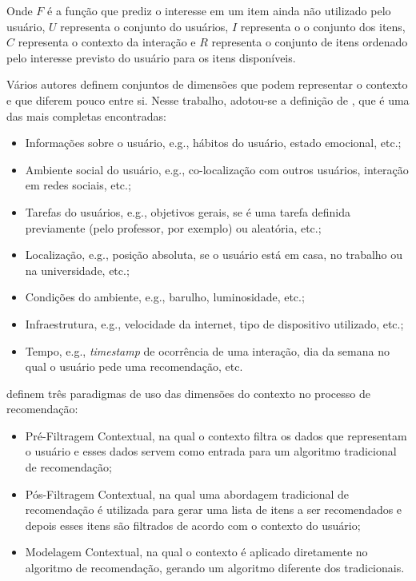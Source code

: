 Onde $F$ é a função que prediz o interesse em um item ainda não utilizado pelo usuário, $U$ representa o conjunto do
usuários, $I$ representa o o conjunto dos itens, $C$ representa o contexto da interação e $R$ representa o conjunto de itens
ordenado pelo interesse previsto do usuário para os itens disponíveis.

Vários autores definem conjuntos de dimensões que podem representar o contexto
\cite{schilit1994context, chen2000survey, zimmermann2007operational} e que diferem pouco entre si. Nesse trabalho,
adotou-se a definição de , que é uma das mais completas encontradas:

\begin{itemize}
\item Informações sobre o usuário, e.g., hábitos do usuário, estado emocional, etc.;
\item Ambiente social do usuário, e.g., co-localização com outros usuários, interação em redes sociais, etc.;
\item Tarefas do usuários, e.g., objetivos gerais, se é uma tarefa definida previamente (pelo professor, por exemplo)
ou aleatória, etc.;
\item Localização, e.g., posição absoluta, se o usuário está em casa, no trabalho ou na universidade, etc.;
\item Condições do ambiente, e.g., barulho, luminosidade, etc.;
\item Infraestrutura, e.g., velocidade da internet, tipo de dispositivo utilizado, etc.;
\item Tempo, e.g., \textit{timestamp} de ocorrência de uma interação, dia da semana no qual o usuário pede uma recomendação, etc.
\end{itemize}

 definem três paradigmas de uso das dimensões do contexto no processo de recomendação:

\begin{itemize}
\item Pré-Filtragem Contextual, na qual o contexto filtra os dados que representam o usuário e esses dados servem
como entrada para um algoritmo tradicional de recomendação;
\item Pós-Filtragem Contextual, na qual uma abordagem tradicional de recomendação é utilizada para gerar uma lista de
itens a ser recomendados e depois esses itens são filtrados de acordo com o contexto do usuário;
\item Modelagem Contextual, na qual o contexto é aplicado diretamente no algoritmo de recomendação, gerando um
algoritmo diferente dos tradicionais.
\end{itemize}

